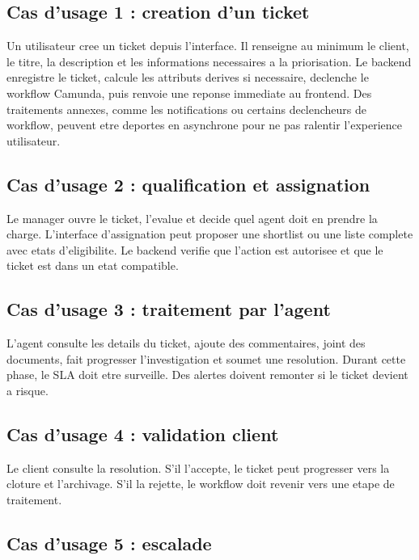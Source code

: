 \subsection{Cas d'usage 1 : creation d'un ticket}

Un utilisateur cree un ticket depuis l'interface. Il renseigne au minimum le client, le titre, la description et les informations necessaires a la priorisation. Le backend enregistre le ticket, calcule les attributs derives si necessaire, declenche le workflow Camunda, puis renvoie une reponse immediate au frontend. Des traitements annexes, comme les notifications ou certains declencheurs de workflow, peuvent etre deportes en asynchrone pour ne pas ralentir l'experience utilisateur.

\subsection{Cas d'usage 2 : qualification et assignation}

Le manager ouvre le ticket, l'evalue et decide quel agent doit en prendre la charge. L'interface d'assignation peut proposer une shortlist ou une liste complete avec etats d'eligibilite. Le backend verifie que l'action est autorisee et que le ticket est dans un etat compatible.

\subsection{Cas d'usage 3 : traitement par l'agent}

L'agent consulte les details du ticket, ajoute des commentaires, joint des documents, fait progresser l'investigation et soumet une resolution. Durant cette phase, le SLA doit etre surveille. Des alertes doivent remonter si le ticket devient a risque.

\subsection{Cas d'usage 4 : validation client}

Le client consulte la resolution. S'il l'accepte, le ticket peut progresser vers la cloture et l'archivage. S'il la rejette, le workflow doit revenir vers une etape de traitement.

\subsection{Cas d'usage 5 : escalade}

